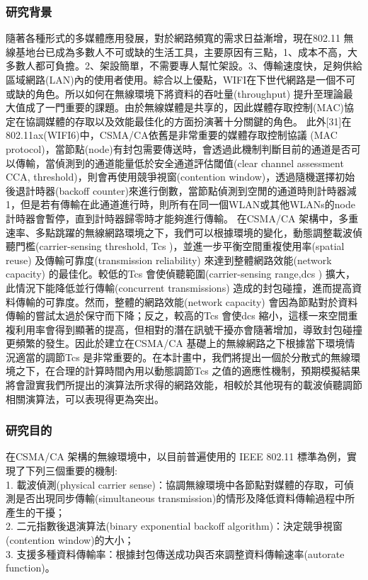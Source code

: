 \documentclass[12pt,a4paper]{article}
\begin{document}
\begin{description}
\subsubsection{研究背景}%
隨著各種形式的多媒體應用發展，對於網路頻寬的需求日益漸增，現在802.11 無線基地台已成為多數人不可或缺的生活工具，主要原因有三點，1、成本不高，大多數人都可負擔。2、架設簡單，不需要專人幫忙架設。3、傳輸速度快，足夠供給區域網路(LAN)內的使用者使用。綜合以上優點，WIFI在下世代網路是一個不可或缺的角色。所以如何在無線環境下將資料的吞吐量(throughput) 提升至理論最大值成了一門重要的課題。由於無線媒體是共享的，因此媒體存取控制(MAC)協定在協調媒體的存取以及效能最佳化的方面扮演著十分關鍵的角色。
此外[31]在802.11ax(WIFI6)中，CSMA/CA依舊是非常重要的媒體存取控制協議 (MAC protocol)，當節點(node)有封包需要傳送時，會透過此機制判斷目前的通道是否可以傳輸，當偵測到的通道能量低於安全通道評估閾值(clear channel assessment CCA, threshold)，則會再使用競爭視窗(contention window)，透過隨機選擇初始後退計時器(backoff counter)來進行倒數，當節點偵測到空閒的通道時則計時器減1，但是若有傳輸在此通道進行時，則所有在同一個WLAN或其他WLANs的node計時器會暫停，直到計時器歸零時才能夠進行傳輸。
在CSMA/CA 架構中，多重速率、多點跳躍的無線網路環境之下，我們可以根據環境的變化，動態調整載波偵聽門檻(carrier-sensing threshold, Tcs )，並進一步平衡空間重複使用率(spatial reuse) 及傳輸可靠度(transmission reliability) 來達到整體網路效能(network capacity) 的最佳化。較低的Tcs 會使偵聽範圍(carrier-sensing range,dcs ) 擴大，此情況下能降低並行傳輸(concurrent transmissions) 造成的封包碰撞，進而提高資料傳輸的可靠度。然而，整體的網路效能(network capacity) 會因為節點對於資料傳輸的嘗試太過於保守而下降；反之，較高的Tcs 會使dcs 縮小，這樣一來空間重複利用率會得到顯著的提高，但相對的潛在訊號干擾亦會隨著增加，導致封包碰撞更頻繁的發生。因此於建立在CSMA/CA 基礎上的無線網路之下根據當下環境情況適當的調節Tcs 是非常重要的。在本計畫中，我們將提出一個於分散式的無線環境之下，在合理的計算時間內用以動態調節Tcs 之值的適應性機制，預期模擬結果將會證實我們所提出的演算法所求得的網路效能，相較於其他現有的載波偵聽調節相關演算法，可以表現得更為突出。\\



\subsubsection{研究目的}%

在CSMA/CA 架構的無線環境中，以目前普遍使用的 IEEE 802.11 標準為例，實現了下列三個重要的機制: \\
1. 載波偵測(physical carrier sense)：協調無線環境中各節點對媒體的存取，可偵測是否出現同步傳輸(simultaneous transmission)的情形及降低資料傳輸過程中所產生的干擾；\\
2. 二元指數後退演算法(binary exponential backoff algorithm)：決定競爭視窗(contention window)的大小；\\
3. 支援多種資料傳輸率：根據封包傳送成功與否來調整資料傳輸速率(autorate function)。


\end{description}
\end{document}
